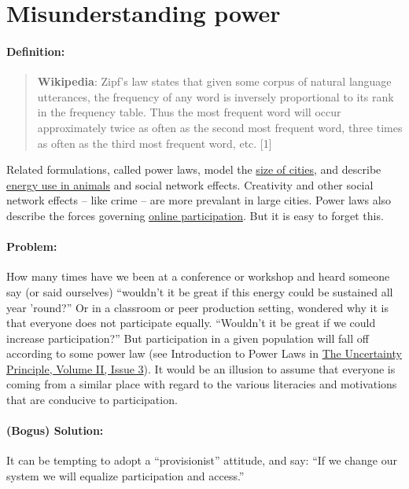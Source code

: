 \section{Misunderstanding power}
\paragraph{Definition:}

\begin{quote}
\textbf{Wikipedia}: Zipf's law states that given some corpus of natural
language utterances, the frequency of any word is inversely proportional
to its rank in the frequency table. Thus the most frequent word will
occur approximately twice as often as the second most frequent word,
three times as often as the third most frequent word, etc. {[}1{]}
\end{quote}

Related formulations, called power laws, model the
\href{http://www2.econ.uu.nl/users/marrewijk/geography/zipf/index.htm}{size
of cities}, and describe
\href{http://pricetags.wordpress.com/2010/10/26/kleibers-law-growth-and-creativity-in-cities/}{energy
use in animals} and social network effects. Creativity and other social
network effects -- like crime -- are more prevalant in large cities.
Power laws also describe the forces governing
\href{http://shirky.com/writings/powerlaw_weblog.html}{online
participation}. But it is easy to forget this.

\paragraph{Problem:} How many times have we been at a conference or
workshop and heard someone say (or said ourselves) ``wouldn't it be
great if this energy could be sustained all year 'round?'' Or in a
classroom or peer production setting, wondered why it is that everyone
does not participate equally. ``Wouldn't it be great if we could
increase participation?'' But participation in a given population will
fall off according to some power law (see Introduction to Power Laws in
\href{http://www.theuncertaintyprinciple.danoff.org/v2i3.html}{The
Uncertainty Principle, Volume II, Issue 3}). It would be an illusion to
assume that everyone is coming from a similar place with regard to the
various literacies and motivations that are conducive to participation.

\paragraph{(Bogus) Solution:} It can be tempting to adopt a ``provisionist''
attitude, and say: ``If we change our system we will equalize
participation and access.''

